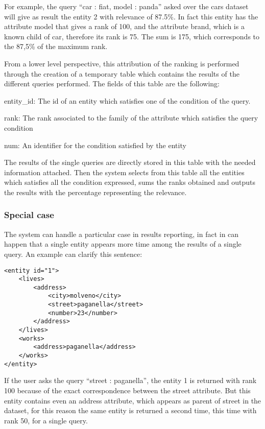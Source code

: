 \documentclass{acm_proc_article-sp-sigmod07}
\begin{document}
For example, the query ``car : fiat, model : panda''  asked over the cars
dataset will give as result the entity 2 with relevance of 87.5\%.
In fact this entity has the attribute model that gives a rank of 100, and
the attribute brand, which is a known child of car, therefore its rank is
75. The sum is 175, which corresponds to the 87,5\% of the maximum rank.

From a lower level perspective, this attribution of the ranking is
performed through the creation of a temporary table which contains the
results of the different queries performed.
The fields of this table are the following:

\begin{description}
\item{entity\_id: } The id of an entity which satisfies one of the
condition of the query.
\item{rank: } The rank associated to the family of the attribute which
satisfies the query condition
\item{num: } An identifier for the condition satisfied by the entity
\end{description}

The results of the single queries are directly stored in this table with
the needed information attached. Then the system selects from this table
all the entities which satisfies all the condition expressed, sums the
ranks obtained and outputs the results with the percentage representing
the relevance.

\subsubsection{Special case}
The system can handle a particular case in results reporting, in fact in
can happen that a single entity appears more time among the results of a
single query.
An example can clarify this sentence:

\begin{verbatim}
<entity id="1">
    <lives>
        <address>
            <city>molveno</city>
            <street>paganella</street>
            <number>23</number>
        </address>
    </lives>
    <works>
        <address>paganella</address>
    </works>
</entity>
\end{verbatim}

If the user asks the query ``street : paganella'', the entity 1 is
returned with rank 100 because of the exact correspondence between the
street attribute.
But this entity contains even an address attribute, which appears as
parent of street in the dataset, for this reason the same entity is
returned a second time, this time with rank 50, for a single query.
\end{document}
